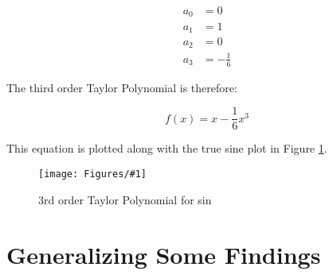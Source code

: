 \documentclass[landscape, twocolumn, 12pt]{article}
\newcommand{\fig}[2]{
\begin{figure}
  \centering
  \texttt{[image: Figures/\#1]}
  \caption{#2}
  \label{Fig:#1}
\end{figure}
}
\begin{document}
\begin{align*}
  a_0&=0 \\ a_1&=1 \\ a_2&=0 \\ a_3&=-\frac{1}{6}
\end{align*}

The third order Taylor Polynomial is therefore:

\begin{equation}
  f(x) = x - \frac{1}{6}x^3
\end{equation}

 This equation is plotted along with the true sine plot in Figure \ref{Fig:3ordersin}.

\fig{3ordersin}{3rd order Taylor Polynomial for sin}

\section{Generalizing Some Findings}




\newpage


\end{document}
